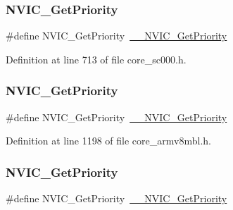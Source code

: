 \subsubsection{\texorpdfstring{N\+V\+I\+C\+\_\+\+Get\+Priority}{NVIC\_GetPriority}\hspace{0.1cm}{\footnotesize\ttfamily [4/13]}}
{\footnotesize\ttfamily \#define N\+V\+I\+C\+\_\+\+Get\+Priority~\hyperlink{group___c_m_s_i_s___core___n_v_i_c_functions_gaeb9dc99c8e7700668813144261b0bc73}{\+\_\+\+\_\+\+N\+V\+I\+C\+\_\+\+Get\+Priority}}



Definition at line 713 of file core\+\_\+sc000.\+h.

\mbox{\label{group___c_m_s_i_s___core___n_v_i_c_functions_gaf59b9d0a791d2157abb319753953eceb}} 
\subsubsection{\texorpdfstring{N\+V\+I\+C\+\_\+\+Get\+Priority}{NVIC\_GetPriority}\hspace{0.1cm}{\footnotesize\ttfamily [5/13]}}
{\footnotesize\ttfamily \#define N\+V\+I\+C\+\_\+\+Get\+Priority~\hyperlink{group___c_m_s_i_s___core___n_v_i_c_functions_gaeb9dc99c8e7700668813144261b0bc73}{\+\_\+\+\_\+\+N\+V\+I\+C\+\_\+\+Get\+Priority}}



Definition at line 1198 of file core\+\_\+armv8mbl.\+h.

\mbox{\label{group___c_m_s_i_s___core___n_v_i_c_functions_gaf59b9d0a791d2157abb319753953eceb}} 
\subsubsection{\texorpdfstring{N\+V\+I\+C\+\_\+\+Get\+Priority}{NVIC\_GetPriority}\hspace{0.1cm}{\footnotesize\ttfamily [6/13]}}
{\footnotesize\ttfamily \#define N\+V\+I\+C\+\_\+\+Get\+Priority~\hyperlink{group___c_m_s_i_s___core___n_v_i_c_functions_gaeb9dc99c8e7700668813144261b0bc73}{\+\_\+\+\_\+\+N\+V\+I\+C\+\_\+\+Get\+Priority}}



